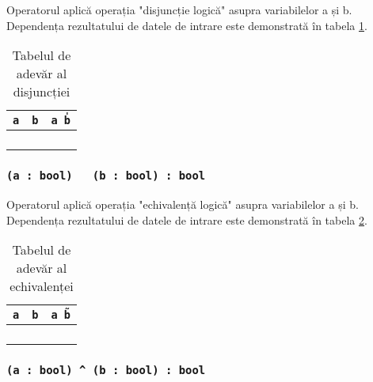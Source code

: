 Operatorul aplică operația "disjuncție logică" asupra variabilelor a și b. Dependența rezultatului de datele de intrare este demonstrată în tabela  \ref{distable}.

\begin{table}[htb]
	\caption{Tabelul de adevăr al disjuncției}
	\label{distable}
	\begin{tabular}{|c|c|c|}
		\hline
		\texttt{a} & \texttt{b} & \texttt{a \| b} 	\\ \hline
		\false{} & \false{} & \false{} 		\\ \hline
		\false{} & \true{}  & \true{}  		\\ \hline
		\true{}  & \false{} & \true{}  		\\ \hline
		\true{}  & \true{}  & \true{}  		\\ \hline
	\end{tabular}
	\vspace{-2em}
\end{table}

\subsubsection{\texttt{(a : bool) ~ (b : bool) : bool}}

Operatorul aplică operația "echivalență logică" asupra variabilelor a și b. Dependența rezultatului de datele de intrare este demonstrată în tabela \ref{logeqtable}.

\begin{table}[htb]
	\caption{Tabelul de adevăr al echivalenței}
	\label{logeqtable}
	\begin{tabular}{|c|c|c|}
		\hline
		\texttt{a} & \texttt{b} & \texttt{a \~ b} \\ \hline
		\false{} & \false{} & \true{}   	\\ \hline
		\false{} & \true{}  & \false{}  	\\ \hline
		\true{}  & \false{} & \false{}  	\\ \hline
		\true{}  & \true{}  & \true{}   	\\ \hline
	\end{tabular}
	\vspace{-2em}
\end{table}

\subsubsection{\texttt{(a : bool) ^ (b : bool) : bool}}

